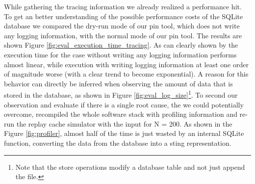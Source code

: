 While gathering the tracing information we already realized a
performance hit. To get an better understanding of the possible
performance costs of the SQLite database we compared the dry-run mode
of our pin tool, which does not write any logging information, with
the normal mode of our pin tool. The results are shown Figure
\ref{fig:eval_execution_time_tracing}. As can clearly shown by the
execution time for the case without writing any logging information
performs almost linear, while execution with writing logging
information at least one order of magnitude worse (with a clear trend
to become exponential). A reason for this behavior can directly be
inferred when observing the amount of data that is stored in the
database, as shown in Figure \ref{fig:eval_log_size}\footnote{Note
  that the store operations modify a database table and not just
  append the file.}. To second our observation and evaluate if there
is a single root cause, the we could potentially overcome, recompiled
the whole software stack with profiling information and re-run the
replay cache simulator with the input for N = 200. As shown in the
Figure \ref{fig:profiler}, almost half of the time is just wasted by
an internal SQLite function, converting the data from the database
into a sting representation.


  


